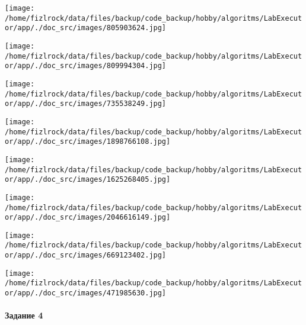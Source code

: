 \documentclass[a4paper, 12pt]{article}
\begin{document}
\texttt{[image: /home/fizlrock/data/files/backup/code\_backup/hobby/algoritms/LabExecutor/app/./doc\_src/images/805903624.jpg]}

\texttt{[image: /home/fizlrock/data/files/backup/code\_backup/hobby/algoritms/LabExecutor/app/./doc\_src/images/809994304.jpg]}

\texttt{[image: /home/fizlrock/data/files/backup/code\_backup/hobby/algoritms/LabExecutor/app/./doc\_src/images/735538249.jpg]}

\texttt{[image: /home/fizlrock/data/files/backup/code\_backup/hobby/algoritms/LabExecutor/app/./doc\_src/images/1898766108.jpg]}

\texttt{[image: /home/fizlrock/data/files/backup/code\_backup/hobby/algoritms/LabExecutor/app/./doc\_src/images/1625268405.jpg]}

\texttt{[image: /home/fizlrock/data/files/backup/code\_backup/hobby/algoritms/LabExecutor/app/./doc\_src/images/2046616149.jpg]}

\texttt{[image: /home/fizlrock/data/files/backup/code\_backup/hobby/algoritms/LabExecutor/app/./doc\_src/images/669123402.jpg]}

\texttt{[image: /home/fizlrock/data/files/backup/code\_backup/hobby/algoritms/LabExecutor/app/./doc\_src/images/471985630.jpg]}
\pagebreak
\paragraph{Задание 4}
\end{document}
